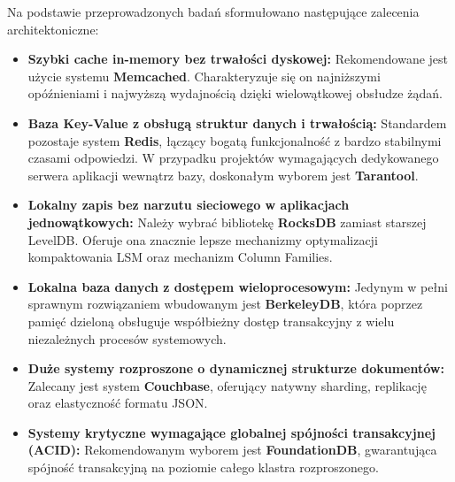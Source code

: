 Na podstawie przeprowadzonych badań sformułowano następujące zalecenia architektoniczne:
\begin{itemize}
    \item \textbf{Szybki cache in-memory bez trwałości dyskowej:} Rekomendowane jest użycie systemu \textbf{Memcached}. Charakteryzuje się on najniższymi opóźnieniami i najwyższą wydajnością dzięki wielowątkowej obsłudze żądań.
    \item \textbf{Baza Key-Value z obsługą struktur danych i trwałością:} Standardem pozostaje system \textbf{Redis}, łączący bogatą funkcjonalność z bardzo stabilnymi czasami odpowiedzi. W przypadku projektów wymagających dedykowanego serwera aplikacji wewnątrz bazy, doskonałym wyborem jest \textbf{Tarantool}.
    \item \textbf{Lokalny zapis bez narzutu sieciowego w aplikacjach jednowątkowych:} Należy wybrać bibliotekę \textbf{RocksDB} zamiast starszej LevelDB. Oferuje ona znacznie lepsze mechanizmy optymalizacji kompaktowania LSM oraz mechanizm Column Families.
    \item \textbf{Lokalna baza danych z dostępem wieloprocesowym:} Jedynym w pełni sprawnym rozwiązaniem wbudowanym jest \textbf{BerkeleyDB}, która poprzez pamięć dzieloną obsługuje współbieżny dostęp transakcyjny z wielu niezależnych procesów systemowych.
    \item \textbf{Duże systemy rozproszone o dynamicznej strukturze dokumentów:} Zalecany jest system \textbf{Couchbase}, oferujący natywny sharding, replikację oraz elastyczność formatu JSON.
    \item \textbf{Systemy krytyczne wymagające globalnej spójności transakcyjnej (ACID):} Rekomendowanym wyborem jest \textbf{FoundationDB}, gwarantująca spójność transakcyjną na poziomie całego klastra rozproszonego.
\end{itemize}

